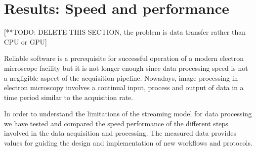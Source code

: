 \section{Results: Speed and performance}


[**TODO: DELETE THIS SECTION, the problem is data transfer rather than CPU or GPU]

Reliable software is a prerequisite for successful operation of a modern electron microscope facility but it is not longer enough since data processing speed is not a negligible aspect of the acquisition pipeline. Nowadays, image processing  in electron microscopy involves a continual input, process and output of data in a time period similar to the acquisition rate.

In order to understand the limitations of the streaming model for data processing we have tested and compared the speed performance of the different steps involved in the data acquisition and processing. The measured data provides values for guiding the design and implementation of new workflows and protocols.

